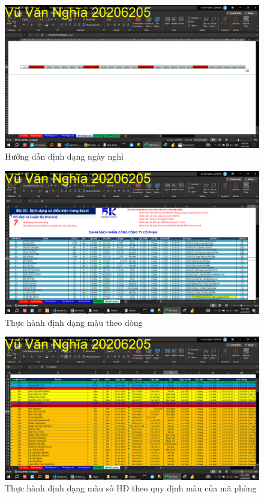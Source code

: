 \documentclass{article}
\begin{document}
\begin{figure}[H]
\centering
\includegraphics[scale = 0.15]{Video8/HuongDan/4.png}
\caption{Hướng dẫn định dạng ngày nghỉ}
\end{figure}
\begin{figure}[H]
\centering
\includegraphics[scale = 0.15]{Video8/ThucHanh/0.png}
\caption{Thực hành định dạng màu theo dòng}
\end{figure}

\begin{figure}[H]
\centering
\includegraphics[scale = 0.15]{Video8/ThucHanh/1.png}
\caption{Thực hành định dạng màu số HĐ theo quy định màu của mã phòng}
\end{figure}
\end{document}
